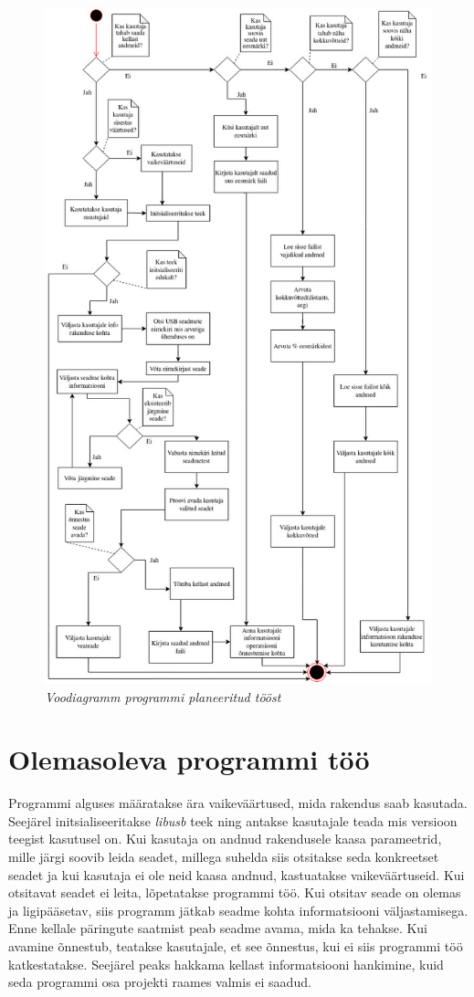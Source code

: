 
\begin{figure}[ht!]
    \centering
    \includegraphics[width=.75\textwidth]{figures/flowchart.jpg}
    \caption{\textit{Voodiagramm programmi planeeritud tööst}}
    \label{fig:flowchart}
\end{figure}
\pagebreak

\section{Olemasoleva programmi töö}\label{sec:programmi-too}
Programmi alguses määratakse ära vaikeväärtused, mida rakendus saab kasutada.
Seejärel initsialiseeritakse \textit{libusb} teek ning antakse kasutajale teada mis versioon teegist kasutusel on.
Kui kasutaja on andnud rakendusele kaasa parameetrid, mille järgi soovib leida seadet, millega suhelda siis otsitakse seda konkreetset seadet ja kui kasutaja ei ole neid kaasa andnud, kastuatakse vaikeväärtuseid.
Kui otsitavat seadet ei leita, lõpetatakse programmi töö.
Kui otsitav seade on olemas ja ligipääsetav, siis programm jätkab seadme kohta informatsiooni väljastamisega.
Enne kellale päringute saatmist peab seadme avama, mida ka tehakse.
Kui avamine õnnestub, teatakse kasutajale, et see õnnestus, kui ei siis programmi töö katkestatakse.
Seejärel peaks hakkama kellast informatsiooni hankimine, kuid seda programmi osa projekti raames valmis ei saadud.

